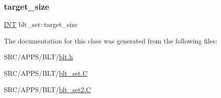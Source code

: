 \mbox{\label{classblt__set_a0fdcdb814cf066f6cf8f32d9a2494867}} 
\subsubsection{\texorpdfstring{target\+\_\+size}{target\_size}}
{\footnotesize\ttfamily \mbox{\hyperlink{galois_8h_a09fddde158a3a20bd2dcadb609de11dc}{I\+NT}} blt\+\_\+set\+::target\+\_\+size}



The documentation for this class was generated from the following files\+:\begin{DoxyCompactItemize}
\item 
S\+R\+C/\+A\+P\+P\+S/\+B\+L\+T/\mbox{\hyperlink{blt_8h}{blt.\+h}}\item 
S\+R\+C/\+A\+P\+P\+S/\+B\+L\+T/\mbox{\hyperlink{blt__set_8_c}{blt\+\_\+set.\+C}}\item 
S\+R\+C/\+A\+P\+P\+S/\+B\+L\+T/\mbox{\hyperlink{blt__set2_8_c}{blt\+\_\+set2.\+C}}\end{DoxyCompactItemize}
